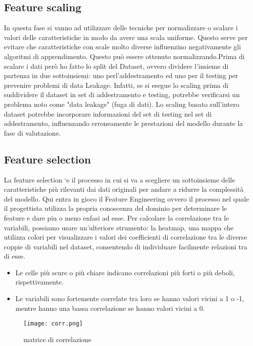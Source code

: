 \documentclass{article}
\begin{document}
\subsection{Feature scaling}
In questa fase si vanno ad utilizzare delle tecniche per normalizzare o scalare i valori delle caratteristiche in modo da avere una scala uniforme. Questo serve per evitare che caratteristiche con scale molto diverse influenzino negativamente gli algoritmi di apprendimento. Questo può essere ottenuto normalizzando.Prima di scalare i dati però ho fatto lo split del Dataset, ovvero dividere l’insieme di partenza in due sottoinsiemi: uno perl’addestramento ed uno per il testing per prevenire problemi di data Leakage.
Infatti, se si esegue lo scaling prima di suddividere il dataset in set di addestramento e testing, potrebbe verificarsi un problema noto come "data leakage" (fuga di dati). Lo scaling basato sull'intero dataset potrebbe incorporare informazioni del set di testing nel set di addestramento, influenzando erroneamente le prestazioni del modello durante la fase di valutazione.

\subsection{Feature selection}
La feature selection `e il processo in cui si va a scegliere un sottoinsieme delle caratteristiche più
rilevanti dai dati originali per andare a ridurre la complessità del modello. Qui entra in gioco il
Feature Engineering ovvero il processo nel quale il progettista utilizza la propria conoscenza del
dominio per determinare le feature e dare piu o meno enfasi ad esse.
\newpage
Per calcolare la correlazione tra le variabili, possiamo usare un’ulteriore strumento: la heatmap,
una mappa che utilizza colori per visualizzare i valori dei coefficienti di correlazione tra le diverse
coppie di variabili nel dataset, consentendo di individuare facilmente relazioni tra di esse.
\begin{itemize}
    \item Le celle più scure o più chiare indicano correlazioni più forti o più deboli, rispettivamente.
    \item Le variabili sono fortemente correlate tra loro se hanno valori vicini a 1 o -1, mentre hanno una bassa correlazione se hanno valori vicini a 0.
\end{itemize}
\begin{figure}
    \centering
    \texttt{[image: corr.png]}
    \caption{matrice di correlazione}
    \label{fig:enter-label}
\end{figure}
\end{document}
